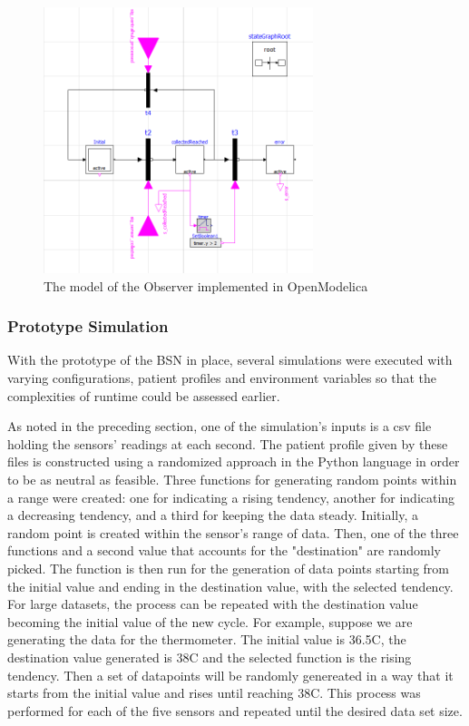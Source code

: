 \begin{figure}[!h]
	\centering
	\includegraphics[width=0.7\textwidth, keepaspectratio]{img/obs_modelica.png}
	\caption{The model of the Observer implemented in OpenModelica}
	\label{fig:obsProt}
\end{figure}

\subsubsection{Prototype Simulation}

With the prototype of the BSN in place, several simulations were executed with varying configurations, patient profiles and environment variables so that the complexities of runtime could be assessed earlier. 

As noted in the preceding section, one of the simulation's inputs is a csv file holding the sensors' readings at each second. The patient profile given by these files is constructed using a randomized approach in the Python language in order to be as neutral as feasible. Three functions for generating random points within a range were created: one for indicating a rising tendency, another for indicating a decreasing tendency, and a third for keeping the data steady. Initially, a random point is created within the sensor's range of data. Then, one of the three functions and a second value that accounts for the "destination" are randomly picked. The function is then run for the generation of data points starting from the initial value and ending in the destination value, with the selected tendency. For large datasets, the process can be repeated with the destination value becoming the initial value of the new cycle. For example, suppose we are generating the data for the thermometer. The initial value is 36.5C, the destination value generated is 38C and the selected function is the rising tendency. Then a set of datapoints will be randomly genereated in a way that it starts from the initial value and rises until reaching 38C. This process was performed for each of the five sensors and repeated until the desired data set size.

